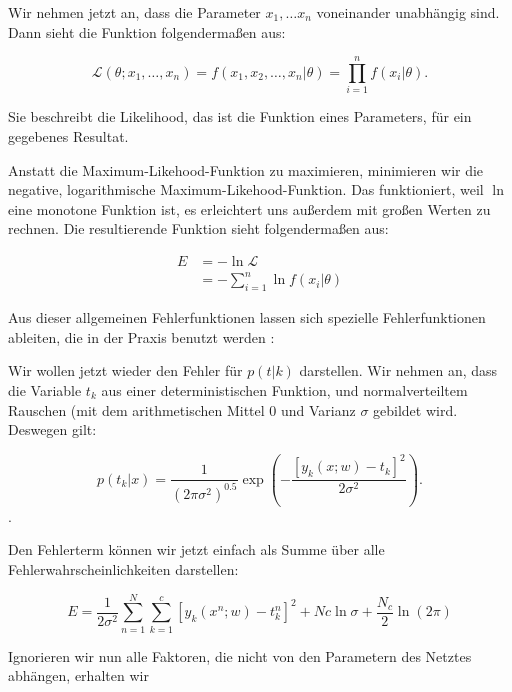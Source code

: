 Wir nehmen jetzt an, dass die Parameter $x_1, \ldots x_n$ voneinander unabhängig sind. Dann sieht die Funktion folgendermaßen aus:

\begin{equation}
  \mathcal{L} (\theta; x_1, \ldots, x_n) =
  f(x_1, x_2, \ldots, x_n | \theta) =
  \prod_{i = 1}^n f(x_i|\theta) .
\end{equation}

Sie beschreibt die Likelihood, das ist die Funktion eines Parameters, für ein gegebenes Resultat. %

Anstatt die Maximum-Likehood-Funktion zu maximieren, minimieren wir die negative, logarithmische Maximum-Likehood-Funktion. Das funktioniert, weil $\ln$ eine monotone Funktion ist, es erleichtert uns außerdem mit großen Werten zu rechnen. Die resultierende Funktion sieht folgendermaßen aus:

\begin{align}
 E  & = - \ln \mathcal{L} \\
  & = - \sum_{i=1}^n \ln f(x_i|\theta) 
\end{align}

Aus dieser allgemeinen Fehlerfunktionen lassen sich spezielle Fehlerfunktionen ableiten, die in der Praxis benutzt werden \cite{bishop1995neural}:

Wir wollen jetzt wieder den Fehler für $p(t|k)$ darstellen. Wir nehmen an, dass die Variable $t_k$ aus einer deterministischen Funktion, und normalverteiltem Rauschen (mit dem arithmetischen Mittel $0$ und Varianz $\sigma$ gebildet wird.  
Deswegen gilt: 

\begin{equation}
  p(t_k|x) = \frac{1}{(2 \pi \sigma^2)^{0.5}} \exp \left( -\frac{ \left[  y_k(x; w) - t_k \right]^2 }{2 \sigma^2} \right).
\end{equation}.

Den Fehlerterm können wir jetzt einfach als Summe über alle Fehlerwahrscheinlichkeiten darstellen:

\begin{equation}
  E = \frac{1}{2 \sigma^2} \sum_{n=1}^{N} \sum_{k=1}^{c} \left[ y_k(x^n; w) - t_k^n \right]^2 + Nc \ln \sigma + \frac{N_c}{2} \ln (2 \pi)
\end{equation}

Ignorieren wir nun alle Faktoren, die nicht von den Parametern des Netztes abhängen, erhalten wir 

